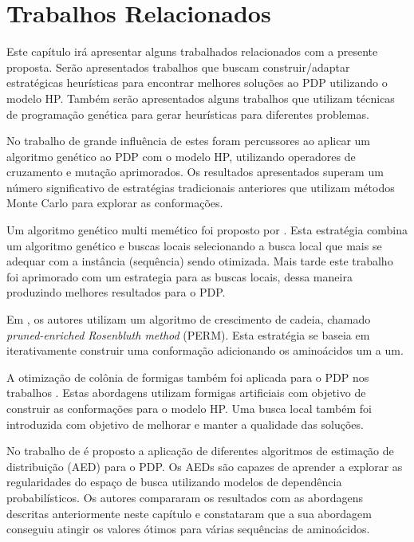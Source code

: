 \chapter{Trabalhos Relacionados}
\label{cap:Trabalhos Relacionados}

Este capítulo irá apresentar alguns trabalhados relacionados com a presente proposta. Serão apresentados trabalhos que buscam construir/adaptar estratégicas heurísticas para encontrar melhores soluções ao PDP utilizando o modelo HP. Também serão apresentados alguns trabalhos que utilizam técnicas de programação genética para gerar heurísticas para diferentes problemas.



No trabalho de grande influência de \cite{unger1993genetic} estes foram percussores ao aplicar um algoritmo genético ao PDP com o modelo HP, utilizando operadores de cruzamento e mutação aprimorados. Os resultados apresentados superam um número significativo de estratégias tradicionais anteriores que utilizam métodos Monte Carlo para explorar as conformações. 

Um algoritmo genético multi memético foi proposto por \cite{krasnogor2002multimeme}. Esta estratégia combina um algoritmo genético e buscas locais selecionando a busca local que mais se adequar com a instância (sequência) sendo otimizada. Mais tarde este trabalho foi aprimorado com um estrategia  para as buscas locais, dessa maneira produzindo melhores resultados para o PDP.

Em \cite{hsu2003growth}, os autores utilizam um algoritmo de crescimento de cadeia, chamado \textit{pruned-enriched Rosenbluth method} (PERM). Esta estratégia se baseia em iterativamente construir uma conformação adicionando os aminoácidos um a um. 

A otimização de colônia de formigas também foi aplicada para o PDP nos trabalhos \cite{shmygelska2002ant,shmygelska2003improved}. Estas abordagens utilizam formigas artificiais com objetivo de construir as conformações para o modelo HP. Uma busca local também foi introduzida com objetivo de melhorar e manter a qualidade das soluções. 

No trabalho de \cite{santanna2008} é proposto a aplicação de diferentes algoritmos de estimação de distribuição (AED) para o PDP. Os AEDs são capazes de aprender a explorar as regularidades do espaço de busca utilizando modelos de dependência probabilísticos. Os autores compararam os resultados com as abordagens descritas anteriormente neste capítulo e constataram que a sua abordagem conseguiu atingir os valores ótimos para várias sequências de aminoácidos.

